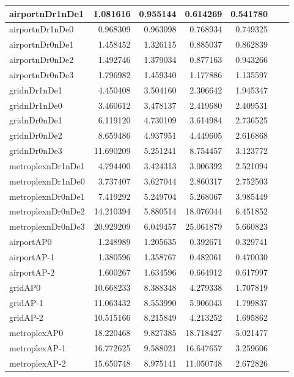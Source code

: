 \begin{longtable}{|l|r|r|r|r|r|r|}
\endlastfoot
airportnDr1nDe1 & 1.081616 & 0.955144 & 0.614269 & 0.541780 \\ \hline
airportnDr1nDe0 & 0.968309 & 0.963098 & 0.768934 & 0.749325 \\ \hline
airportnDr0nDe1 & 1.458452 & 1.326115 & 0.885037 & 0.862839 \\ \hline
airportnDr0nDe2 & 1.492746 & 1.379034 & 0.877163 & 0.943266 \\ \hline
airportnDr0nDe3 & 1.796982 & 1.459340 & 1.177886 & 1.135597 \\ \hline
gridnDr1nDe1 & 4.450408 & 3.504160 & 2.306642 & 1.945347 \\ \hline
gridnDr1nDe0 & 3.460612 & 3.478137 & 2.419680 & 2.409531 \\ \hline
gridnDr0nDe1 & 6.119120 & 4.730109 & 3.614984 & 2.736525 \\ \hline
gridnDr0nDe2 & 8.659486 & 4.937951 & 4.449605 & 2.616868 \\ \hline
gridnDr0nDe3 & 11.690209 & 5.251241 & 8.754457 & 3.123772 \\ \hline
metroplexnDr1nDe1 & 4.794400 & 3.424313 & 3.006392 & 2.521094 \\ \hline
metroplexnDr1nDe0 & 3.737407 & 3.627044 & 2.860317 & 2.752503 \\ \hline
metroplexnDr0nDe1 & 7.419292 & 5.249704 & 5.268067 & 3.985449 \\ \hline
metroplexnDr0nDe2 & 14.210394 & 5.880514 & 18.076044 & 6.451852 \\ \hline
metroplexnDr0nDe3 & 20.929209 & 6.049457 & 25.061879 & 5.660823 \\ \hline
airportAP0 & 1.248989 & 1.205635 & 0.392671 & 0.329741 \\ \hline
airportAP-1 & 1.380596 & 1.358767 & 0.482061 & 0.470030 \\ \hline
airportAP-2 & 1.600267 & 1.634596 & 0.664912 & 0.617997 \\ \hline
gridAP0 & 10.668233 & 8.388348 & 4.279338 & 1.707819 \\ \hline
gridAP-1 & 11.063432 & 8.553990 & 5.906043 & 1.799837 \\ \hline
gridAP-2 & 10.515166 & 8.215849 & 4.213252 & 1.695862 \\ \hline
metroplexAP0 & 18.220468 & 9.827385 & 18.718427 & 5.021477 \\ \hline
metroplexAP-1 & 16.772625 & 9.588021 & 16.647657 & 3.259606 \\ \hline
metroplexAP-2 & 15.650748 & 8.975141 & 11.050748 & 2.672826 \\ \hline

\end{longtable}
